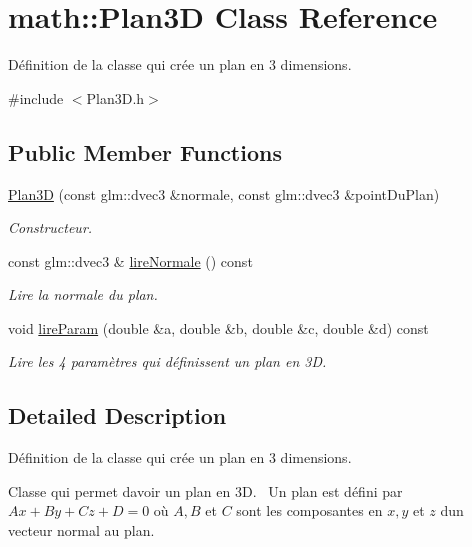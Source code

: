 \hypertarget{classmath_1_1_plan3_d}{}\section{math\+:\+:Plan3\+D Class Reference}
\label{classmath_1_1_plan3_d}


Définition de la classe qui crée un plan en 3 dimensions.  




{\ttfamily \#include $<$Plan3\+D.\+h$>$}

\subsection*{Public Member Functions}
\begin{DoxyCompactItemize}
\item 
\hyperlink{classmath_1_1_plan3_d_af74f4c3852d6a0763fdce91be58ddda2}{Plan3\+D} (const glm\+::dvec3 \&normale, const glm\+::dvec3 \&point\+Du\+Plan)
\begin{DoxyCompactList}\small\item\em Constructeur. \end{DoxyCompactList}\item 
const glm\+::dvec3 \& \hyperlink{classmath_1_1_plan3_d_a359b996e0c4bb4b07b44debc1cdeb77e}{lire\+Normale} () const 
\begin{DoxyCompactList}\small\item\em Lire la normale du plan. \end{DoxyCompactList}\item 
void \hyperlink{classmath_1_1_plan3_d_a0246c57422ec6bcd5cffe0935e734819}{lire\+Param} (double \&a, double \&b, double \&c, double \&d) const 
\begin{DoxyCompactList}\small\item\em Lire les 4 paramètres qui définissent un plan en 3\+D. \end{DoxyCompactList}\end{DoxyCompactItemize}


\subsection{Detailed Description}
Définition de la classe qui crée un plan en 3 dimensions. 

Classe qui permet d\textquotesingle{}avoir un plan en 3\+D.~\newline
Un plan est défini par $ Ax + By + Cz + D = 0 $ où $ A, B $ et $ C $ sont les composantes en $ x, y $ et $ z $ d\textquotesingle{}un vecteur normal au plan.

